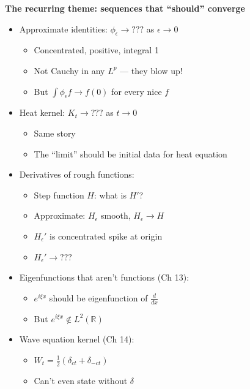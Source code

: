 \documentclass[
  10pt,
  letterpaper,
]{scrbook}
\providecommand{\tightlist}{%
  \setlength{\itemsep}{0pt}\setlength{\parskip}{0pt}}
\begin{document}
\textbf{The recurring theme: sequences that ``should'' converge}

\begin{itemize}
\tightlist
\item
  Approximate identities: \(\phi_\epsilon \to ???\) as
  \(\epsilon \to 0\)

  \begin{itemize}
  \tightlist
  \item
    Concentrated, positive, integral 1
  \item
    Not Cauchy in any \(L^p\) --- they blow up!
  \item
    But \(\int \phi_\epsilon f \to f(0)\) for every nice \(f\)
  \end{itemize}
\item
  Heat kernel: \(K_t \to ???\) as \(t \to 0\)

  \begin{itemize}
  \tightlist
  \item
    Same story
  \item
    The ``limit'' should be initial data for heat equation
  \end{itemize}
\item
  Derivatives of rough functions:

  \begin{itemize}
  \tightlist
  \item
    Step function \(H\): what is \(H'\)?
  \item
    Approximate: \(H_\epsilon\) smooth, \(H_\epsilon \to H\)
  \item
    \(H_\epsilon'\) is concentrated spike at origin
  \item
    \(H_\epsilon' \to ???\)
  \end{itemize}
\item
  Eigenfunctions that aren't functions (Ch 13):

  \begin{itemize}
  \tightlist
  \item
    \(e^{i\xi x}\) should be eigenfunction of \(\frac{d}{dx}\)
  \item
    But \(e^{i\xi x} \notin L^2(\mathbb{R})\)
  \end{itemize}
\item
  Wave equation kernel (Ch 14):

  \begin{itemize}
  \tightlist
  \item
    \(W_t = \frac{1}{2}(\delta_{ct} + \delta_{-ct})\)
  \item
    Can't even state without \(\delta\)
  \end{itemize}
\end{itemize}
\end{document}
